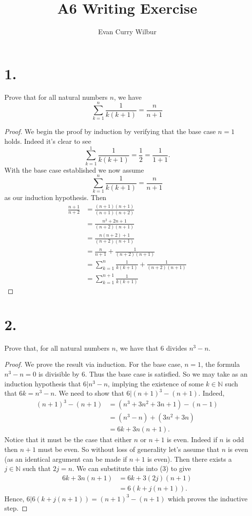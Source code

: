 \documentclass[]{article}
\title{A6 Writing Exercise}
\author{Evan Curry Wilbur}
\begin{document}
\maketitle


\section*{1.}
Prove that for all natural numbers $n$, we have
$$
	\sum_{k=1}^n \frac{1}{k(k+ 1)} = \frac{n}{n + 1}
$$
\begin{proof}
	We begin the proof by induction by verifying that the base case $n = 1$ holds. Indeed it's clear to see 
	$$
		\sum_{k=1}^1 \frac{1}{k(k+ 1)} = \frac{1}{2} = \frac{1}{1 + 1}.
	$$
	With the base case established we now assume 
	$$
		\sum_{k=1}^n \frac{1}{k(k+ 1)} = \frac{n}{n+1}
	$$
	as our induction hypothesis. Then
	\begin{align*}
		\frac{n + 1}{n + 2} &= \frac{(n + 1)(n + 1)}{(n + 1)(n + 2)} \\
		&= \frac{n^2 + 2n + 1}{(n + 2)(n + 1)} \\
		&= \frac{n(n + 2) + 1}{(n + 2)(n + 1)} \\
		&= \frac{n}{n + 1} + \frac{1}{(n + 2)(n + 1)} \\
		&= \sum_{k=1}^n \frac{1}{k(k+ 1)} + \frac{1}{(n + 2)(n + 1)} \\
		&= \sum_{k=1}^{n + 1} \frac{1}{k(k+ 1)}
	\end{align*}
\end{proof}

\section*{2.}
Prove that, for all natural numbers $n$, we have that 6 divides $n^3 - n$.
\begin{proof}
	We prove the result via induction. For the base case, $n = 1$, the formula $n^3 - n = 0$ is divisible by 6. Thus the base case is satisfied. So we may take as an induction hypothesis that $6 | n^3 - n$, implying the existence of some $k \in \mathbb{N}$ such that $6k = n^3 - n$. We need to show that $6 | (n + 1)^3 - (n + 1)$. Indeed,
	\begin{align}
		(n + 1)^3 - (n + 1) &= (n^3 + 3n^2 + 3n + 1) - (n - 1) \\
		&= (n^3 - n) + (3n^2 + 3n) \\
		&= 6k + 3n(n + 1).
	\end{align}
	Notice that it must be the case that either $n$ or $n + 1$ is even. Indeed if $n$ is odd then $n + 1$ must be even. So without loss of generality let's assume that $n$ is even (as an identical argument can be made if $n + 1$ is even). Then there exists a $j \in \mathbb{N}$ such that $2j = n$. We can substitute this into (3) to give
	\begin{align*}
		6k + 3n(n + 1) &= 6k + 3(2j)(n + 1) \\
		&= 6(k + j(n + 1)).
	\end{align*}
	Hence, $6 | 6(k + j(n + 1)) = (n + 1)^3 - (n + 1)$ which proves the inductive step.
\end{proof}
\end{document}
